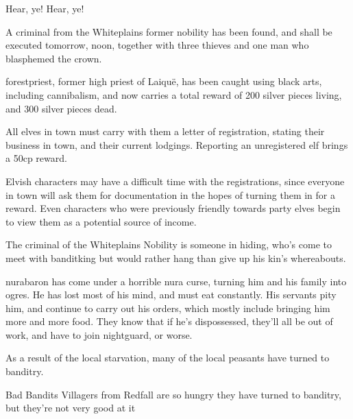 \begin{multicols}{2}
\begin{speechtext}

	Hear, ye! Hear, ye!

	A criminal from the Whiteplains former nobility has been found, and shall be executed tomorrow, noon, together with three thieves and one man who blasphemed the crown.

	\Gls{forestpriest}, former high priest of Laiqu\"{e}, has been caught using black arts, including cannibalism, and now carries a total reward of 200 silver pieces living, and 300 silver pieces dead.

	All elves in \gls{town} must carry with them a letter of registration, stating their business in town, and their current lodgings.
	Reporting an unregistered elf brings a 50cp reward.

\end{speechtext}

Elvish characters may have a difficult time with the registrations, since everyone in \gls{town} will ask them for documentation in the hopes of turning them in for a reward.
Even characters who were previously friendly towards party elves begin to view them as a potential source of income.

The criminal of the Whiteplains Nobility is someone in hiding, who's come to meet with \gls{banditking} but would rather hang than give up his kin's whereabouts.

\stopcontents[sq]

\resumecontents[Town]

\label{desperatemeasures}

\stopcontents[Town]

\startcontents[sq]

\sqminitoc

\noindent
\gls{nurabaron} has come under a horrible nura curse, turning him and his family into ogres.
He has lost most of his mind, and must eat constantly.
His servants pity him, and continue to carry out his orders, which mostly include bringing him more and more food.
They know that if he's dispossessed, they'll all be out of work, and have to join \gls{nightguard}, or worse.

As a result of the local starvation, many of the local peasants have turned to banditry.

{\N Bad Bandits}%
{Villagers from Redfall are so hungry they have turned to banditry, but they're not very good at it}%


\end{multicols}
